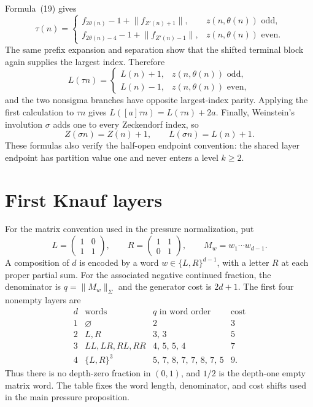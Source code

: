 Formula~(19) gives
\[
 \tau(n)=
 \begin{cases}
 f_{2\theta(n)}-1+\lVert f_{Z'(n)+1}\rVert,
   &z(n,\theta(n))\text{ odd},\\
 f_{2\theta(n)-4}-1+\lVert f_{Z'(n)-1}\rVert,
   &z(n,\theta(n))\text{ even}.
 \end{cases}
\]
The same prefix expansion and separation show that the shifted terminal
block again supplies the largest index.  Therefore
\[
 L(\tau n)=
 \begin{cases}
 L(n)+1,&z(n,\theta(n))\text{ odd},\\
 L(n)-1,&z(n,\theta(n))\text{ even},
 \end{cases}
\]
and the two nonsigma branches have opposite largest-index parity.  Applying
the first calculation to \(\tau n\) gives
\(L([a]\tau n)=L(\tau n)+2a\).  Finally, Weinstein's involution \(\sigma\)
adds one to every Zeckendorf index, so
\[
 Z(\sigma n)=Z(n)+1,
 \qquad L(\sigma n)=L(n)+1.
\]
These formulas also verify the half-open endpoint convention: the shared
layer endpoint has partition value one and never enters a level \(k\ge2\).

\section{First Knauf layers}

For the matrix convention used in the pressure normalization, put
\[
 L=\begin{pmatrix}1&0\\1&1\end{pmatrix},\qquad
 R=\begin{pmatrix}1&1\\0&1\end{pmatrix},
 \qquad M_w=w_1\cdots w_{d-1}.
\]
A composition of \(d\) is encoded by a word
\(w\in\{L,R\}^{d-1}\), with a letter \(R\) at each proper partial sum.
For the associated negative continued fraction, the denominator is
\(q=\lVert M_w\rVert_\Sigma\) and the generator cost is \(2d+1\).  The first
four nonempty layers are
\[
\begin{array}{c|c|c|c}
d&\text{words}&q\text{ in word order}&\text{cost}\\ \hline
1&\varnothing&2&3\\
2&L,R&3,\,3&5\\
3&LL,LR,RL,RR&4,\,5,\,5,\,4&7\\
4&\{L,R\}^3&5,\,7,\,8,\,7,\,7,\,8,\,7,\,5&9.
\end{array}
\]
Thus there is no depth-zero fraction in \((0,1)\), and \(1/2\) is the
depth-one empty matrix word.  The table fixes the word length, denominator,
and cost shifts used in the main pressure proposition.

